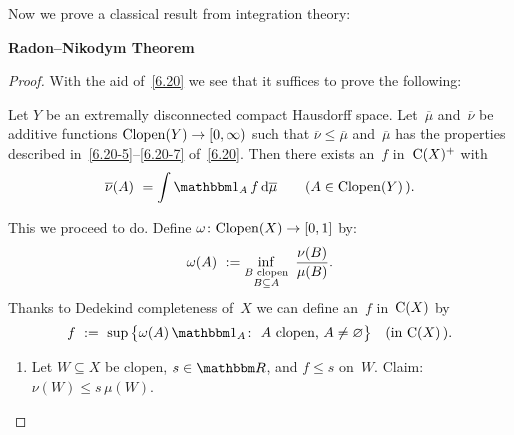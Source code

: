 \documentclass[main.tex]{subfiles}
\begin{document}
\begin{psec}{6.21}%
\noindent Now we prove a classical result from integration theory:

\vspace{.5em}
\noindent\textbf{Radon--Nikodym Theorem}\  
\end{psec}
\begin{proof}
With the aid of~\ref{6.20}
we see that it suffices to prove the following:
\vspace{.5em}
\begin{center}
\begin{minipage}{.8\textwidth}
Let $Y$ be an extremally disconnected compact Hausdorff space.
Let~$\overline\mu$ and~$\overline\nu$
be additive functions $\mathrm{Clopen}(Y)\rightarrow[0,\infty)$
such that $\overline\nu\leq\overline\mu$
and~$\overline\mu$ has the properties described
in~\ref{6.20-5}--\ref{6.20-7} of~\ref{6.20}.
Then there exists an~$f$ in~$\mathrm{C}(X)^+$ with
\begin{equation*}
\overline\nu(A)\ =\int\mathbb{1}_A\,f\,\mathrm{d}\overline\mu
   \qquad (A\in\clopen(Y)\,)\htam{.}
\end{equation*}
\end{minipage}
\end{center}
\vspace{.5em}
This we proceed to do.
Define $\omega\colon\mathrm{Clopen}(X)\rightarrow[0,1]$ by:
\begin{equation*}
\omega(A)\ :=\inf_{\substack{B\text{ clopen}\\B\subseteq A}}\  
\frac{\nu(B)}{\mu(B)}\text{.}
\end{equation*}
Thanks to Dedekind completeness of~$X$
we can define an~$f$ in~$\mathrm{C}(X)$ by
\begin{equation*}
f\ :=\ \sup\,\bigl\{ \omega(A)\,\mathbb{1}_A\colon\ 
   A\htam{ clopen,} \ A\neq\varnothing\bigr\}
\quad\htam{(in }\Cont{X}\,\htam{).}
\end{equation*}
\begin{enumerate}[label=(\Roman*)]
\item\label{6.21-I}
Let $W\subseteq X$ be clopen,
$s\in\R$, and $f\leq s$ on~$W$.
Claim: $\nu(W)\leq s\,\mu(W)$.


\end{enumerate}
\end{proof}
\end{document}
